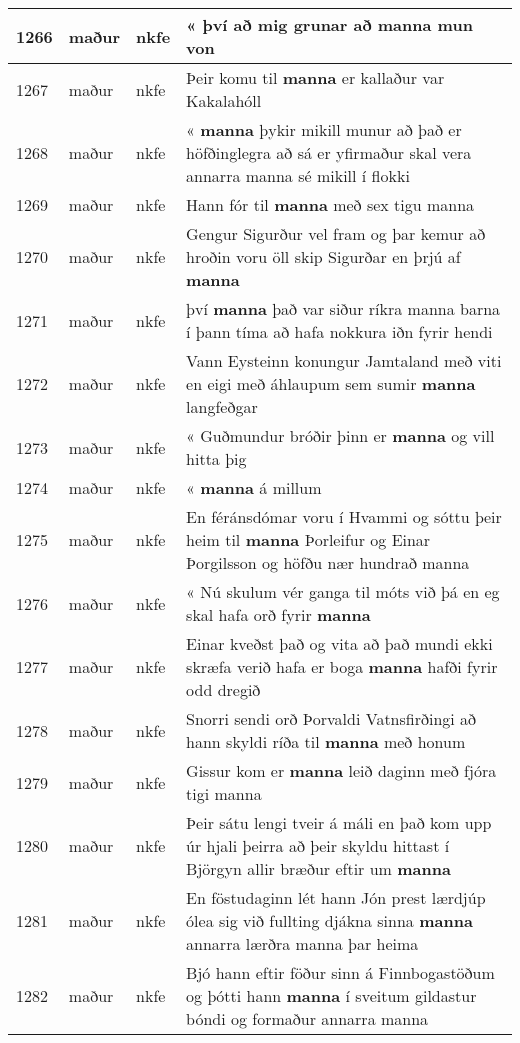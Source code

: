 \documentclass{article}
\begin{document}
\begin{longtable}{p{1cm}|p{1cm}|p{1cm}|p{13cm}}
\hline
1266&maður&nkfe&« því að mig grunar að \textbf{manna} mun von\\
\hline
1267&maður&nkfe&Þeir komu til \textbf{manna} er kallaður var Kakalahóll\\
\hline
1268&maður&nkfe&« \textbf{manna} þykir mikill munur að það er höfðinglegra að sá er yfirmaður skal vera annarra manna sé mikill í flokki\\
\hline
1269&maður&nkfe&Hann fór til \textbf{manna} með sex tigu manna\\
\hline
1270&maður&nkfe&Gengur Sigurður vel fram og þar kemur að hroðin voru öll skip Sigurðar en þrjú af \textbf{manna} \\
\hline
1271&maður&nkfe&því \textbf{manna} það var siður ríkra manna barna í þann tíma að hafa nokkura iðn fyrir hendi\\
\hline
1272&maður&nkfe&Vann Eysteinn konungur Jamtaland með viti en eigi með áhlaupum sem sumir \textbf{manna} langfeðgar\\
\hline
1273&maður&nkfe&« Guðmundur bróðir þinn er \textbf{manna} og vill hitta þig\\
\hline
1274&maður&nkfe&« \textbf{manna} á millum\\
\hline
1275&maður&nkfe&En féránsdómar voru í Hvammi og sóttu þeir heim til \textbf{manna} Þorleifur og Einar Þorgilsson og höfðu nær hundrað manna\\
\hline
1276&maður&nkfe&« Nú skulum vér ganga til móts við þá en eg skal hafa orð fyrir \textbf{manna} \\
\hline
1277&maður&nkfe&Einar kveðst það og vita að það mundi ekki skræfa verið hafa er boga \textbf{manna} hafði fyrir odd dregið\\
\hline
1278&maður&nkfe&Snorri sendi orð Þorvaldi Vatnsfirðingi að hann skyldi ríða til \textbf{manna} með honum\\
\hline
1279&maður&nkfe&Gissur kom er \textbf{manna} leið daginn með fjóra tigi manna\\
\hline
1280&maður&nkfe&Þeir sátu lengi tveir á máli en það kom upp úr hjali þeirra að þeir skyldu hittast í Björgyn allir bræður eftir um \textbf{manna} \\
\hline
1281&maður&nkfe&En föstudaginn lét hann Jón prest lærdjúp ólea sig við fullting djákna sinna \textbf{manna} annarra lærðra manna þar heima\\
\hline
1282&maður&nkfe&Bjó hann eftir föður sinn á Finnbogastöðum og þótti hann \textbf{manna} í sveitum gildastur bóndi og formaður annarra manna\\
\hline

\end{longtable}
\end{document}
